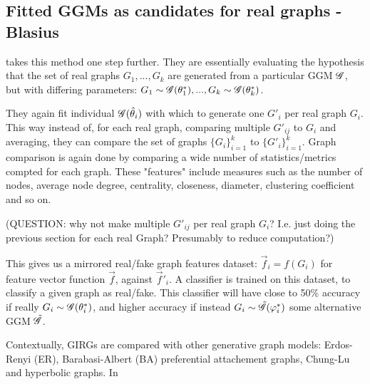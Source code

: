 \subsection{Fitted GGMs as candidates for real graphs - Blasius}
\cite{blasius2018towards} takes this method one step further. They are essentially evaluating the hypothesis that the set of real graphs $G_1, ..., G_k$ are generated from a particular GGM $\mathscr{G}$, but with differing parameters: $G_1 \sim \mathscr{G}(\theta^*_1), ..., G_k \sim \mathscr{G}(\theta^*_k)$. 

They again fit individual $\mathscr{G}(\hat{\theta}_i)$ with which to generate one $G'_i$ per real graph $G_i$. This way instead of, for each real graph, comparing multiple $G'_{ij}$ to $G_i$ and averaging, they can compare the set of graphs $\{G_i\}_{i=1}^k$ to $\{G'_i\}_{i=1}^k$. Graph comparison is again done by comparing a wide number of statistics/metrics compted for each graph. These "features" include measures such as the number of nodes, average node degree, centrality, closeness, diameter, clustering coefficient and so on.

(QUESTION: why not make multiple $G'_{ij}$ per real graph $G_i$? I.e. just doing the previous section for each real Graph? Presumably to reduce computation?)


This gives us a mirrored real/fake graph features dataset: $\vec{f}_i = f(G_i)$ for feature vector function $\vec{f}$, against $\vec{f}'_i$. A classifier is trained on this dataset, to classify a given graph as real/fake. This classifier will have close to 50\% accuracy if really $G_i \sim \mathscr{G}(\theta^*_i)$, and higher accuracy if instead $G_i \sim \tilde{\mathscr{G}}(\varphi^*_i)$ some alternative GGM $\tilde{\mathscr{G}}$.


Contextually, GIRGs are compared with other generative graph models: Erdos-Renyi (ER), Barabasi-Albert (BA) preferential attachement graphs, Chung-Lu and hyperbolic graphs.
In \cite{blasius2022efficiently}
